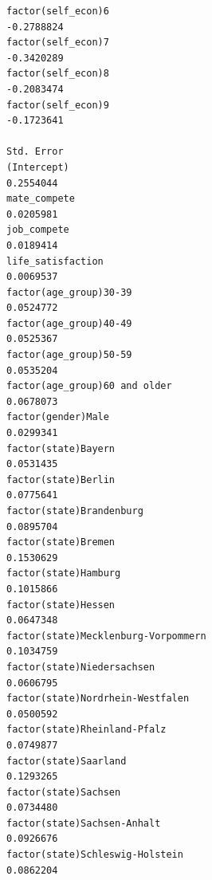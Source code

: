 \documentclass[
]{article}
\begin{document}
\begin{table}
\begin{minipage}[t]{\linewidth}
{\begin{verbatim}
factor(self_econ)6                                                                -0.2788824
factor(self_econ)7                                                                -0.3420289
factor(self_econ)8                                                                -0.2083474
factor(self_econ)9                                                                -0.1723641
                                                                                  Std. Error
(Intercept)                                                                        0.2554044
mate_compete                                                                       0.0205981
job_compete                                                                        0.0189414
life_satisfaction                                                                  0.0069537
factor(age_group)30-39                                                             0.0524772
factor(age_group)40-49                                                             0.0525367
factor(age_group)50-59                                                             0.0535204
factor(age_group)60 and older                                                      0.0678073
factor(gender)Male                                                                 0.0299341
factor(state)Bayern                                                                0.0531435
factor(state)Berlin                                                                0.0775641
factor(state)Brandenburg                                                           0.0895704
factor(state)Bremen                                                                0.1530629
factor(state)Hamburg                                                               0.1015866
factor(state)Hessen                                                                0.0647348
factor(state)Mecklenburg-Vorpommern                                                0.1034759
factor(state)Niedersachsen                                                         0.0606795
factor(state)Nordrhein-Westfalen                                                   0.0500592
factor(state)Rheinland-Pfalz                                                       0.0749877
factor(state)Saarland                                                              0.1293265
factor(state)Sachsen                                                               0.0734480
factor(state)Sachsen-Anhalt                                                        0.0926676
factor(state)Schleswig-Holstein                                                    0.0862204

\end{verbatim}}
\end{minipage}
\end{table}
\end{document}
